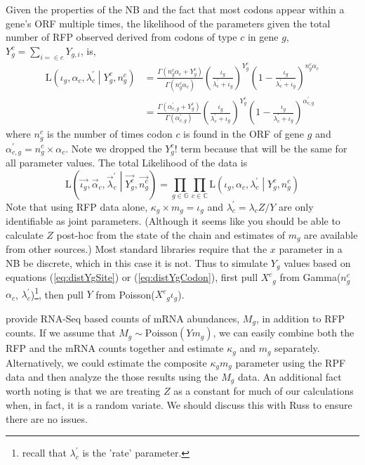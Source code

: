 \documentclass{article}
\newcommand{\WaitTerm}{\ensuremath{X}\xspace} %
\newcommand{\Xc}{\ensuremath{\WaitTerm^c}\xspace}
\newcommand{\Xgc}{\ensuremath{{\Xc}_{g}}\xspace}
\newcommand{\alphac}{\ensuremath{{\alpha_c}}\xspace}
\newcommand{\alphacgprime}{\ensuremath{{\alpha_{c,g}^\prime}}\xspace}
\newcommand{\alphacvec}{\ensuremath{{\vec{\alpha}_c}}\xspace}
\newcommand{\lambdac}{\ensuremath{{\lambda_c}}\xspace}
\newcommand{\lambdacprime}{\ensuremath{{\lambda_c^\prime}}\xspace}
\newcommand{\lambdacprimevec}{\ensuremath{{\vec{\lambda}_c^\prime}}\xspace}
\newcommand{\ngc}{\ensuremath{{n_{g}^c}}\xspace}
\newcommand{\mg}{\ensuremath{{m_g}}\xspace}
\newcommand{\Mg}{\ensuremath{{M_g}}\xspace}
\newcommand{\iotag}{\ensuremath{{\iota_g}}\xspace}
\newcommand{\kappag}{\ensuremath{{\kappa_{g}}}\xspace}
\newcommand{\Ztheta}{\ensuremath{{Z}}\xspace}
\newcommand{\Yg}{\ensuremath{{Y_{g}}}\xspace}
\newcommand{\Ytotal}{\ensuremath{{Y}}\xspace}
\newcommand{\Ygi}{\ensuremath{{Y_{g,i}}}\xspace}
\newcommand{\Ygc}{\ensuremath{{Y_{g}^c}}\xspace}
\newcommand{\Lik}{\ensuremath{\text{L}}\xspace}
\newcommand{\setG}{\ensuremath{\mathbb{G}}\xspace}
\newcommand{\setC}{\ensuremath{\mathbb{C}}\xspace}
\newcommand{\Ygcvec}{\ensuremath{{\Vec{\Ygc}}}\xspace}
\newcommand{\ngcvec}{\ensuremath{{\Vec{\ngc}}}\xspace}
\newcommand{\iotagvec}{\ensuremath{{\Vec{\iotag}}}\xspace}
\begin{document}
Given the properties of the NB \citep[p.~141]{ForbesEtAl2011} and the fact that most codons appear within a gene's ORF multiple times, the likelihood of the parameters given the total number of RFP observed derived from codons of type $c$ in gene $g$, $\Ygc = \sum_{i=\in c} \Ygi$, is,
\begin{align}
  \Lik\left(\iotag, \alphac, \lambdacprime \middle| \Ygc, \ngc\right) &= \frac{\Gamma\left(\ngc \alphac + \Ygc\right)}{\Gamma\left(\ngc \alphac\right) } 
  \left(\frac{\iotag}{\lambdacprime + \iotag}\right)^\Ygc \left(1-\frac{\iotag}{\lambdacprime + \iotag}\right)^{\ngc \alphac}\\
\label{eq:distYgCodon}&= \frac{\Gamma\left(\alphacgprime + \Ygc\right)}{\Gamma\left(\alphacgprime\right)} 
  \left(\frac{\iotag}{\lambdacprime + \iotag}\right)^\Ygc \left(1-\frac{\iotag}{\lambdacprime + \iotag}\right)^{\alphacgprime}
\end{align}
where $\ngc$ is the number of times codon $c$ is found in the ORF of gene $g$ and $\alphacgprime = \ngc \times \alphac$.
Note we dropped the $\Ygc!$ term because that will be the same for all parameter values.
The total Likelihood of the data is
\begin{equation}
  \Lik\left(\iotagvec, \alphacvec, \lambdacprimevec \middle| \Ygcvec, \ngcvec\right) = \prod_{g \in \setG} \prod_{c \in \setC}  \Lik\left(\iotag, \alphac, \lambdacprime \middle| \Ygc, \ngc\right)
\end{equation}
Note that using RFP data alone, $\kappag \times \mg = \iotag$ and $\lambdacprime = \lambdac \Ztheta/\Ytotal$ are only identifiable as joint parameters. 
(Although it seems like you should be able to calculate \Ztheta post-hoc from the state of the chain and estimates of \mg are available from other sources.)
Most standard libraries require that the $x$ parameter in a NB be discrete, which in this case it is not.
Thus to simulate \Yg values based on equations (\ref{eq:distYgSite}) or (\ref{eq:distYgCodon}), first pull $\Xgc$ from Gamma(\ngc \alphac, \lambdacprime)\footnote{recall that \lambdacprime is the 'rate' parameter.}, then pull $Y$ from Poisson($\Xgc \iotag$).
  
\citet{PopEtAl2014} provide RNA-Seq based counts of mRNA abundances, \Mg, in addition to RFP counts.
If we assume that $\Mg \sim \text{Poisson}(\Ytotal \mg)$, we can easily combine both the RFP and the mRNA counts together and estimate $\kappag$ and $\mg$ separately.
Alternatively, we could estimate the composite \kappag \mg parameter using the RPF data and then analyze the those results using the \Mg data.
An additional fact worth noting is that we are treating $Z$ as a constant for much of our calculations when, in fact, it is a random variate.
We should discuss this with Russ to ensure there are no issues.
\end{document}
